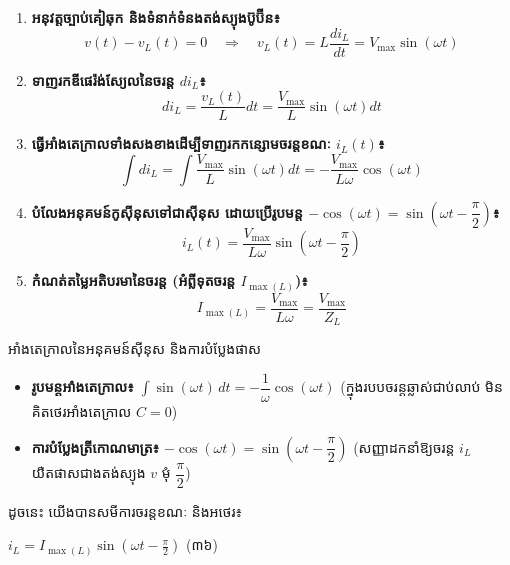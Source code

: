 \begin{enumerate}[leftmargin=2em, itemsep=4pt]
	\item \textbf{អនុវត្តច្បាប់គៀឆុក និងទំនាក់ទំនងតង់ស្យុងប៊ូប៊ីន៖}
	\[ v(t) - v_L(t) = 0 \quad \Longrightarrow \quad v_L(t) = L\dfrac{di_L}{dt} = V_{\max}\sin(\omega t) \]

	\item \textbf{ទាញរកឌីផេរ៉ង់ស្យែលនៃចរន្ត $di_L$៖}
	\[ di_L = \dfrac{v_L(t)}{L} dt = \dfrac{V_{\max}}{L}\sin(\omega t) dt \]

	\item \textbf{ធ្វើអាំងតេក្រាលទាំងសងខាងដើម្បីទាញរកកន្សោមចរន្តខណៈ $i_L(t)$៖}
	\[ \int di_L = \int \dfrac{V_{\max}}{L}\sin(\omega t) dt = -\dfrac{V_{\max}}{L\omega}\cos(\omega t) \]

	\item \textbf{បំលែងអនុគមន៍កូស៊ីនុសទៅជាស៊ីនុស ដោយប្រើរូបមន្ត $-\cos(\omega t) = \sin\left(\omega t - \dfrac{\pi}{2}\right)$៖}
	\[ i_L(t) = \dfrac{V_{\max}}{L\omega}\sin\left(\omega t - \dfrac{\pi}{2}\right) \]

	\item \textbf{កំណត់តម្លៃអតិបរមានៃចរន្ត (អំព្លីទុតចរន្ត $I_{\max(L)}$)៖}
	\[ I_{\max(L)} = \dfrac{V_{\max}}{L\omega} = \dfrac{V_{\max}}{Z_L} \]
\end{enumerate}

\begin{mathbox}{អាំងតេក្រាលនៃអនុគមន៍ស៊ីនុស និងការបំប្លែងផាស}
	\begin{itemize}[itemsep=2pt, topsep=1pt, parsep=0pt, leftmargin=1.4em]
		\item \textbf{រូបមន្តអាំងតេក្រាល៖} $\displaystyle\int \sin(\omega t)\,dt = -\dfrac{1}{\omega}\cos(\omega t)$ \quad (ក្នុងរបបចរន្តឆ្លាស់ជាប់លាប់ មិនគិតថេរអាំងតេក្រាល $C=0$)
		\item \textbf{ការបំប្លែងត្រីកោណមាត្រ៖} $-\cos(\omega t) = \sin\left(\omega t - \dfrac{\pi}{2}\right)$ \quad (សញ្ញាដកនាំឱ្យចរន្ត $i_L$ យឺតផាសជាងតង់ស្យុង $v$ មុំ $\dfrac{\pi}{2}$)
	\end{itemize}
\end{mathbox}

\vspace{0.2em}
\noindent
ដូចនេះ យើងបានសមីការចរន្តខណៈ និងអថេរ៖
\begin{center}
	$\boxed{i_L = I_{\max(L)}\sin\left(\omega t - \frac{\pi}{2}\right)}$ \quad (៣៦)
\end{center}

